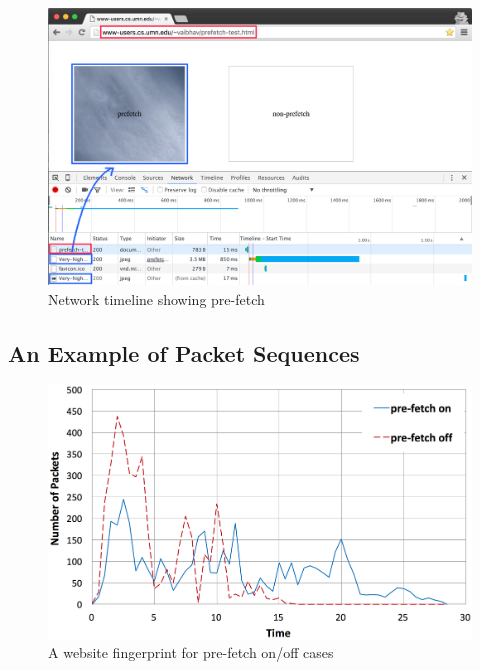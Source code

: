 \begin{figure}[h]
\includegraphics[width=\textwidth]{figures/prefetch-network-edited.png}
\centering
\caption{Network timeline showing pre-fetch}
\label{fig:network}
\end{figure}


\subsection{An Example of Packet Sequences}

\begin{figure}[H]
\includegraphics[width=0.95\columnwidth]{figures/prefetch.png}
\centering
\caption{A website fingerprint for pre-fetch on/off cases}
\label{fig:prefetch}
\end{figure}

